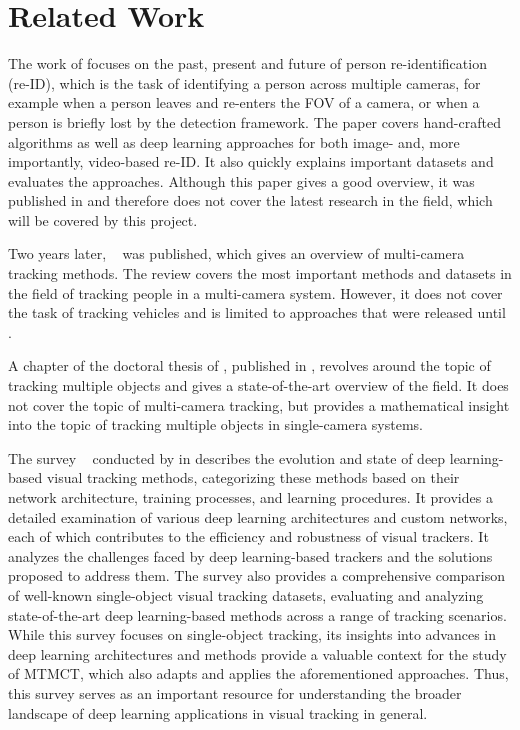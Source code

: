 \section{Related Work}\label{sec:related_work}
The work of \textcite{Zheng16c} focuses on the past, present and future of person re-identification (re-ID), which is the task of identifying a person across multiple cameras, for example when a person leaves and re-enters the FOV of a camera, or when a person is briefly lost by the detection framework. The paper covers hand-crafted algorithms as well as deep learning approaches for both image- and, more importantly, video-based re-ID. It also quickly explains important datasets and evaluates the approaches. Although this paper gives a good overview, it was published in \citeyear{Zheng16c} and therefore does not cover the latest research in the field, which will be covered by this project.

Two years later, ~\cite{Iguernaissi18} was published, which gives an overview of multi-camera tracking methods. The review covers the most important methods and datasets in the field of tracking people in a multi-camera system. However, it does not cover the task of tracking vehicles and is limited to approaches that were released until \citeyear{Iguernaissi18}.

A chapter of the doctoral thesis of \textcite[Chapter 5]{Tian19}, published in \citeyear{Tian19}, revolves around the topic of tracking multiple objects and gives a state-of-the-art overview of the field. It does not cover the topic of multi-camera tracking, but provides a mathematical insight into the topic of tracking multiple objects in single-camera systems.

The survey ~\cite{Zadeh21} conducted by \citeauthor{Zadeh21} in \citeyear{Zadeh21} describes the evolution and state of deep learning-based visual tracking methods, categorizing these methods based on their network architecture, training processes, and learning procedures. It provides a detailed examination of various deep learning architectures and custom networks, each of which contributes to the efficiency and robustness of visual trackers. It analyzes the challenges faced by deep learning-based trackers and the solutions proposed to address them. The survey also provides a comprehensive comparison of well-known single-object visual tracking datasets, evaluating and analyzing state-of-the-art deep learning-based methods across a range of tracking scenarios. While this survey focuses on single-object tracking, its insights into advances in deep learning architectures and methods provide a valuable context for the study of MTMCT, which also adapts and applies the aforementioned approaches. Thus, this survey serves as an important resource for understanding the broader landscape of deep learning applications in visual tracking in general.

